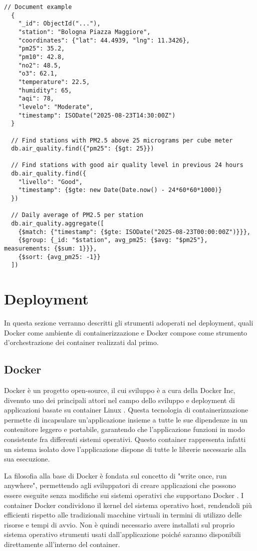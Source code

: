 \begin{lstlisting}[caption={Query MongoDB}, label=lst:mongodb]
  // Document example
  {
    "_id": ObjectId("..."),
    "station": "Bologna Piazza Maggiore",
    "coordinates": {"lat": 44.4939, "lng": 11.3426},
    "pm25": 35.2,
    "pm10": 42.8,
    "no2": 48.5,
    "o3": 62.1,
    "temperature": 22.5,
    "humidity": 65,
    "aqi": 78,
    "levelo": "Moderate",
    "timestamp": ISODate("2025-08-23T14:30:00Z")
  }
    
  // Find stations with PM2.5 above 25 micrograms per cube meter
  db.air_quality.find({"pm25": {$gt: 25}})

  // Find stations with good air quality level in previous 24 hours
  db.air_quality.find({
    "livello": "Good",
    "timestamp": {$gte: new Date(Date.now() - 24*60*60*1000)}
  })
    
  // Daily average of PM2.5 per station
  db.air_quality.aggregate([
    {$match: {"timestamp": {$gte: ISODate("2025-08-23T00:00:00Z")}}},
    {$group: {_id: "$station", avg_pm25: {$avg: "$pm25"}, measurements: {$sum: 1}}},
    {$sort: {avg_pm25: -1}}
  ])
\end{lstlisting}

\section{Deployment}

In questa sezione verranno descritti gli strumenti adoperati nel deployment, quali Docker come ambiente di containerizzazione e Docker compose come strumento d'orchestrazione dei container realizzati dal primo.

\subsection{Docker}

Docker è un progetto open-source, il cui sviluppo è a cura della Docker Inc, divenuto uno dei principali attori nel campo dello sviluppo e deployment di applicazioni basate su container Linux \cite{mouat2015docker}. Questa tecnologia di containerizzazione permette di incapsulare un'applicazione insieme a tutte le sue dipendenze in un contenitore leggero e portabile, garantendo che l'applicazione funzioni in modo consistente fra differenti sistemi operativi. Questo container rappresenta infatti un sistema isolato dove l'applicazione dispone di tutte le librerie necessarie alla sua esecuzione.

La filosofia alla base di Docker è fondata sul concetto di "write once, run anywhere", permettendo agli sviluppatori di creare applicazioni che possono essere eseguite senza modifiche sui sistemi operativi che supportano Docker \cite{merkel2014docker}. I container Docker condividono il kernel del sistema operativo host, rendendoli più efficienti rispetto alle tradizionali macchine virtuali in termini di utilizzo delle risorse e tempi di avvio. Non è quindi necessario avere installati sul proprio sistema operativo strumenti usati dall'applicazione poiché saranno disponibili direttamente all'interno del container.

